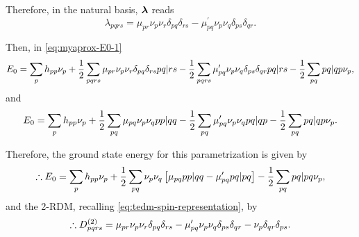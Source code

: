 Therefore, in the natural basis, $ \boldsymbol{\mathrm{\lambda}}$ reads
\begin{equation}
    \lambda_{pqrs} =
    \mu_{pr} \nu_p \nu_r \delta_{pq} \delta_{rs}
    -
    \mu_{pq}^{\prime} \nu_p \nu_q \delta_{ps} \delta_{qr}
    .
\end{equation}

Then, in \cref{eq:myaprox-E0-1}
\begin{equation}
    E_0 =
    \sum_{p} h_{pp} \nu_p +
    \frac{1}{2} \sum_{pqrs} 
    \mu_{pr} \nu_p \nu_r \delta_{pq} \delta_{rs}
    \PBraket{pq | rs}
    -
    \frac{1}{2} \sum_{pqrs} 
    \mu_{pq}^{\prime} \nu_p \nu_q \delta_{ps} \delta_{qr}
    \PBraket{pq | rs}
    -
    \frac{1}{2} \sum_{pq} \PBraket{pq | qp} \nu_p
    ,
\end{equation}
and
\begin{equation}
    E_0 =
    \sum_{p} h_{pp} \nu_p +
    \frac{1}{2} \sum_{pq} 
    \mu_{pq} \nu_p \nu_q 
    \PBraket{pp | qq}
    -
    \frac{1}{2} \sum_{pq} 
    \mu_{pq}^{\prime} \nu_p \nu_q
    \PBraket{pq | qp}
    -
    \frac{1}{2} \sum_{pq} \PBraket{pq | qp} \nu_p
    .
\end{equation}

Therefore, the ground state energy for this parametrization is given by
\begin{equation}
    \therefore
    E_0 =
    \sum_{p} h_{pp} \nu_p +
    \frac{1}{2} \sum_{pq} 
    \nu_p \nu_q
    \left[ 
        \mu_{pq} \PBraket{pp | qq}
        -
        \mu_{pq}^{\prime} \PBraket{pq | pq}
    \right]
    -
    \frac{1}{2} \sum_{pq} 
    \PBraket{pq | pq} \nu_p
    ,
\end{equation}
and the 2-RDM, recalling \cref{eq:tedm-spin-representation}, by 
\begin{equation}
    \therefore
    D^{\left( 2 \right)}_{pqrs} =
    \mu_{pr} \nu_p \nu_r \delta_{pq} \delta_{rs}
    -
    \mu_{pq}^{\prime} \nu_p \nu_q \delta_{ps} \delta_{qr}
    -
    \nu_p \delta_{qr} \delta_{ps}
    .
\end{equation}


